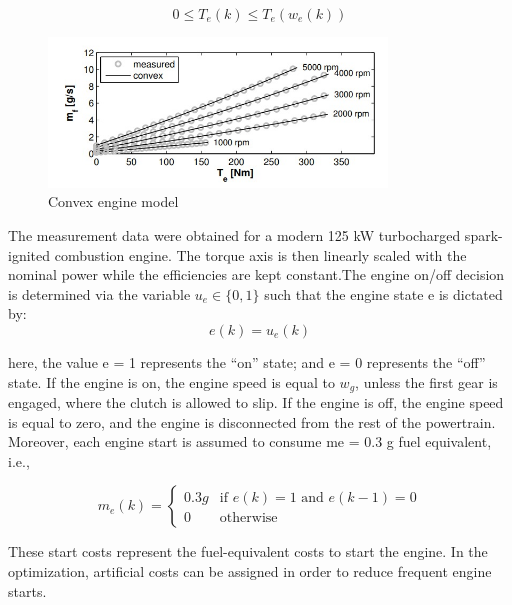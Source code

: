 \documentclass[conference]{IEEEtran}
\begin{document}
\begin{equation}
    0 \leq T_e(k) \leq T_e(w_e(k))
\end{equation}

\begin{figure}[h]
\includegraphics[width=9cm]{engine model.jpeg}
\caption{Convex engine model}
\end{figure}



The measurement data were obtained for a modern 125 kW turbocharged spark-ignited combustion engine. The torque axis is then linearly scaled with the nominal power while the efficiencies are kept constant.The engine on/off decision is determined via the variable $u_e \in \{0, 1\}$ such that the engine state e is dictated by:
\begin{equation}
    e(k) = u_{e}(k)
\end{equation}

here, the value e = 1 represents the “on” state; and e = 0 represents the “off” state. If the engine is on, the engine speed is equal to $w_g$, unless the first gear is engaged, where the clutch is allowed to slip. If the engine is off, the engine speed is equal to zero, and the engine is disconnected from the rest of the powertrain. Moreover, each engine start is assumed to consume me = 0.3 g fuel equivalent, i.e., 

\begin{equation}\label{eq1}
m_e(k)= \begin{cases}
    0.3 g & \text{if } e(k) = 1 \text{ and } e(k-1) = 0\\
    0              & \text{otherwise}
\end{cases}
\end{equation}

These start costs represent the fuel-equivalent costs to start the engine. In the optimization, artificial costs can be assigned in order to reduce frequent engine starts.
\end{document}

